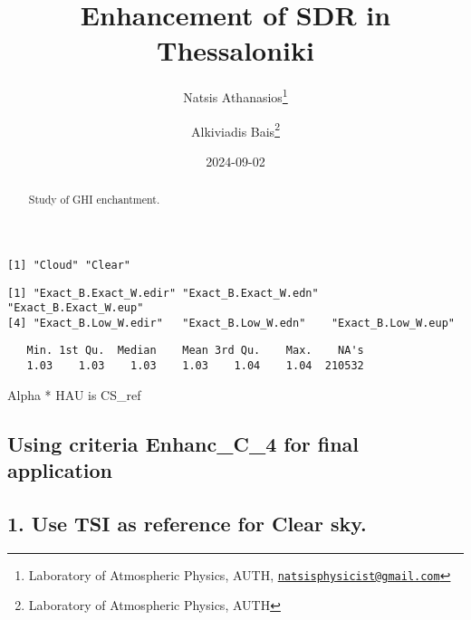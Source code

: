 \documentclass[
  10pt,
  a4paper,oneside]{article}
\title{Enhancement of SDR in Thessaloniki}
\author{Natsis Athanasios\footnote{Laboratory of Atmospheric Physics, AUTH, \href{mailto:natsisphysicist@gmail.com}{\nolinkurl{natsisphysicist@gmail.com}}} \and Alkiviadis Bais\footnote{Laboratory of Atmospheric Physics, AUTH}}
\date{2024-09-02}
\begin{document}
\maketitle
\begin{abstract}
Study of GHI enchantment.
\end{abstract}

{
\hypersetup{linkcolor=}
\setcounter{tocdepth}{4}
\tableofcontents
}
\begin{verbatim}
[1] "Cloud" "Clear"
\end{verbatim}

\begin{verbatim}
[1] "Exact_B.Exact_W.edir" "Exact_B.Exact_W.edn"  "Exact_B.Exact_W.eup" 
[4] "Exact_B.Low_W.edir"   "Exact_B.Low_W.edn"    "Exact_B.Low_W.eup"   
\end{verbatim}

\begin{verbatim}
   Min. 1st Qu.  Median    Mean 3rd Qu.    Max.    NA's 
   1.03    1.03    1.03    1.03    1.04    1.04  210532 
\end{verbatim}

Alpha * HAU is CS\_ref

\hypertarget{using-criteria-enhanc_c_4-for-final-application}{%
\subsection{\texorpdfstring{Using criteria \textbf{Enhanc\_C\_4} for final application}{Using criteria Enhanc\_C\_4 for final application}}\label{using-criteria-enhanc_c_4-for-final-application}}

\hypertarget{use-tsi-as-reference-for-clear-sky.}{%
\subsection{1. Use TSI as reference for Clear sky.}\label{use-tsi-as-reference-for-clear-sky.}}
\end{document}
